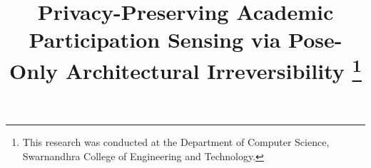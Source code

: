 \documentclass[conference]{IEEEtran}
\begin{document}
\title{Privacy-Preserving Academic Participation Sensing via Pose-Only Architectural Irreversibility
\thanks{This research was conducted at the Department of Computer Science, Swarnandhra College of Engineering and Technology.}
}

\author{
}

\maketitle
\end{document}
